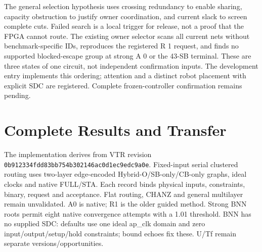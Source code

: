 \documentclass[conference,10pt]{IEEEtran}
\begin{document}
The general selection hypothesis uses crossing redundancy to enable sharing, capacity obstruction to justify owner coordination, and current slack to screen complete cuts. Failed search is a local trigger for release, not a proof that the FPGA cannot route. The existing owner selector scans all current nets without benchmark-specific IDs, reproduces the registered R 1 request, and finds no supported blocked-escape group at strong A 0 or the 43-SB terminal. These are three states of one circuit, not independent confirmation inputs. The development entry implements this ordering; attention and a distinct robot placement with explicit SDC are registered. Complete frozen-controller confirmation remains pending.
\section{Complete Results and Transfer}
The implementation derives from VTR revision \texttt{0b912334fdd83bb754b302146ac0d1ec9edc9a0e}. Fixed-input serial clustered routing uses two-layer edge-encoded Hybrid-O/SB-only/CB-only graphs, ideal clocks and native FULL/STA. Each record binds physical inputs, constraints, binary, request and acceptance. Flat routing, CHANZ and general multilayer remain unvalidated. A0 is native; R1 is the older guided method. Strong BNN roots permit eight native convergence attempts with a 1.01 threshold. BNN has no supplied SDC: defaults use one ideal ap\_clk domain and zero input/output/setup/hold constraints; bound echoes fix these. U/Tf remain separate versions/opportunities.
\end{document}
